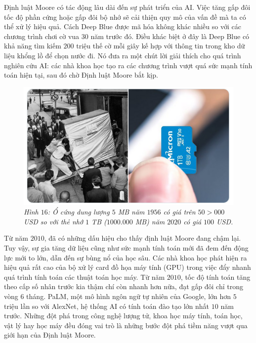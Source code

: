 \begin{multicols}{2}
	\vskip 0.1cm
	Định luật Moore có tác động lâu dài đến sự phát triển của AI. Việc tăng gấp đôi tốc độ phần cứng  hoặc gấp đôi bộ nhớ sẽ cải thiện quy mô của vấn đề mà ta có thể xử lý hiệu quả. Cách Deep Blue được mã hóa không khác nhiều so với các chương trình chơi cờ vua $30$ năm trước đó. Điều khác biệt ở đây là Deep Blue có khả năng tìm kiếm $200$ triệu thế cờ mỗi giây kế hợp với thông tin trong kho dữ liệu khổng lồ để chọn nước đi. Nó đưa ra một chút lời giải thích cho quá trình nghiên cứu AI: các nhà khoa học tạo ra các chương trình vượt quá sức mạnh tính toán hiện tại, sau đó chờ Định luật Moore bắt kịp.
	\begin{figure}[H]
		\vspace*{-5pt}
		\centering
		\captionsetup{labelformat= empty, justification=centering}
		\includegraphics[width= 1\linewidth]{Disk.png}
		\caption{\small\textit{\color{cackithi}Hình $16$: Ổ cứng dung lượng $5$ MB năm $1956$ có giá trên $50{>}000$ USD so với thẻ nhớ $1$ TB ($1000{.}000$ MB) năm $2020$ có giá $100$ USD.}}
		\vspace*{-10pt}
	\end{figure}
	Từ năm $2010$, đã có những dấu hiệu cho thấy định luật Moore đang chậm lại. Tuy vậy, sự gia tăng dữ liệu cũng như sức mạnh tính toán mới đã đem đến động lực mới to lớn, dẫn đến sự bùng nổ của học sâu. Các nhà khoa học phát hiện ra hiệu quả rất cao của bộ xử lý card đồ họa máy tính (GPU) trong việc đẩy nhanh quá trình tính toán các thuật toán học máy. Từ năm $2010$, tốc độ tính toán tăng theo cấp số nhân trước kia thậm chí còn nhanh hơn nữa, đạt gấp đôi chỉ trong vòng $6$ tháng. PaLM, một mô hình ngôn ngữ tự nhiên của Google, lớn hơn $5$ triệu lần so với AlexNet, hệ thống AI có tính toán đào tạo lớn nhất $10$ năm trước. Những đột phá trong công nghệ lượng tử, khoa học máy tính, toán học, vật lý hay học máy đều đóng vai trò là những bước đột phá tiềm năng vượt qua giới hạn của Định luật Moore.

\end{multicols}
